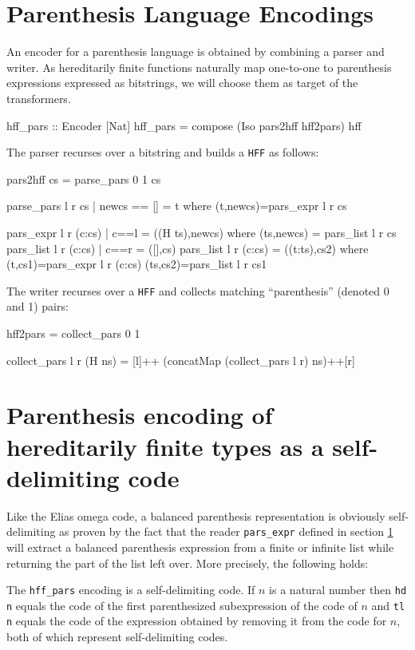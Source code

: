 \documentclass[]{INCLUDES/llncs}
\begin{document}
\section{Parenthesis Language Encodings} \label{paren}

An encoder for a parenthesis language is obtained by
combining a parser and writer. As hereditarily finite
functions naturally map one-to-one to parenthesis expressions expressed as
bitstrings, we will choose them as target of the transformers.
\begin{code}
hff_pars :: Encoder [Nat]
hff_pars = compose (Iso pars2hff hff2pars) hff
\end{code}

The parser recurses over a bitstring and builds a {\tt HFF} as follows:
\begin{code}
pars2hff cs = parse_pars 0 1 cs

parse_pars l r cs | newcs == [] = t where
  (t,newcs)=pars_expr l r cs

pars_expr l r (c:cs) | c==l = ((H ts),newcs) where 
  (ts,newcs) = pars_list l r cs    
  pars_list l r (c:cs) | c==r = ([],cs)
  pars_list l r (c:cs) = ((t:ts),cs2) where 
    (t,cs1)=pars_expr l r (c:cs)
    (ts,cs2)=pars_list l r cs1
\end{code}
The writer recurses over a {\tt HFF} and collects
matching ``parenthesis'' (denoted 0 and 1) pairs:
\begin{code}
hff2pars = collect_pars 0 1

collect_pars l r (H ns) =
  [l]++ (concatMap (collect_pars l r) ns)++[r] 
\end{code}

\section{Parenthesis encoding of hereditarily finite types as a
self-delimiting code}

Like the Elias omega code, a balanced parenthesis
representation is obviously self-delimiting as proven by the fact that 
the reader {\tt pars\_expr} defined in section \ref{paren} will
extract a balanced parenthesis expression from a finite or infinite list
while returning the part of the list left over.
More precisely, the following holds:
\begin{prop}
The {\tt hff\_pars} encoding is a self-delimiting code. If $n$ is a natural
number then {\tt hd n} equals the code of the first parenthesized subexpression
of the code of $n$ and {\tt tl n} equals the code of the expression obtained by
removing it from the code for $n$, both of which represent self-delimiting codes.
\end{prop}
\end{document}
